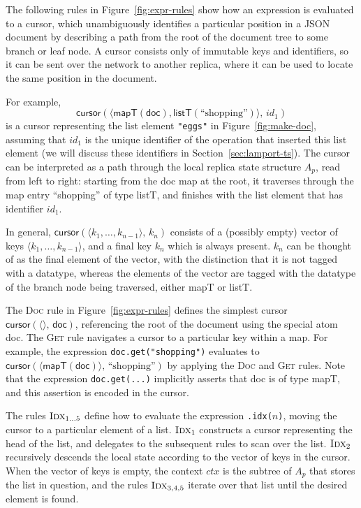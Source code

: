 \documentclass[10pt,journal,compsoc]{IEEEtran}
\begin{document}
The following rules in Figure~\ref{fig:expr-rules} show how an expression is evaluated to a cursor, which unambiguously identifies a particular position in a JSON document by describing a path from the root of the document tree to some branch or leaf node. A cursor consists only of immutable keys and identifiers, so it can be sent over the network to another replica, where it can be used to locate the same position in the document.

For example,
\[ \mathsf{cursor}(\langle \mathsf{mapT}(\mathsf{doc}), \mathsf{listT}(\text{``shopping''}) \rangle,\, \mathit{id}_1) \]
is a cursor representing the list element \verb|"eggs"| in Figure~\ref{fig:make-doc}, assuming that $\mathit{id}_1$ is the unique identifier of the operation that inserted this list element (we will discuss these identifiers in Section~\ref{sec:lamport-ts}). The cursor can be interpreted as a path through the local replica state structure $A_p$, read from left to right: starting from the \textsf{doc} map at the root, it traverses through the map entry ``shopping'' of type \textsf{listT}, and finishes with the list element that has identifier $\mathit{id}_1$.

In general, $\mathsf{cursor}(\langle k_1, \dots, k_{n-1} \rangle,\, k_n)$ consists of a (possibly empty) vector of keys $\langle k_1, \dots, k_{n-1} \rangle$, and a final key $k_n$ which is always present. $k_n$ can be thought of as the final element of the vector, with the distinction that it is not tagged with a datatype, whereas the elements of the vector are tagged with the datatype of the branch node being traversed, either \textsf{mapT} or \textsf{listT}.

The \textsc{Doc} rule in Figure~\ref{fig:expr-rules} defines the simplest cursor $\mathsf{cursor}(\langle\rangle,\, \mathsf{doc})$, referencing the root of the document using the special atom \textsf{doc}. The \textsc{Get} rule navigates a cursor to a particular key within a map. For example, the expression \verb|doc.get("shopping")| evaluates to $\mathsf{cursor}(\langle \mathsf{mapT}(\mathsf{doc}) \rangle,\, \text{``shopping''})$ by applying the \textsc{Doc} and \textsc{Get} rules. Note that the expression \verb|doc.get(...)| implicitly asserts that \textsf{doc} is of type \textsf{mapT}, and this assertion is encoded in the cursor.

The rules $\textsc{Idx}_{1 \dots 5}$ define how to evaluate the expression \verb|.idx(|$n$\verb|)|, moving the cursor to a particular element of a list. $\textsc{Idx}_1$ constructs a cursor representing the head of the list, and delegates to the subsequent rules to scan over the list. $\textsc{Idx}_2$ recursively descends the local state according to the vector of keys in the cursor. When the vector of keys is empty, the context $\mathit{ctx}$ is the subtree of $A_p$ that stores the list in question, and the rules $\textsc{Idx}_{3,4,5}$ iterate over that list until the desired element is found.
\end{document}
